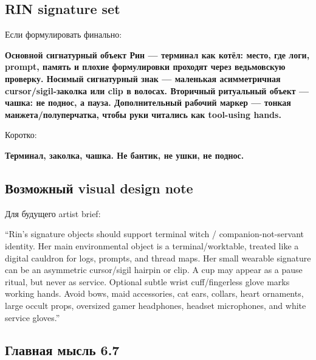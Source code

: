 \subsection*{RIN signature set}

Если формулировать финально:

\textbf{Основной сигнатурный объект Рин --- терминал как котёл: место,
где логи, prompt, память и плохие формулировки проходят через
ведьмовскую проверку. Носимый сигнатурный знак --- маленькая
асимметричная cursor/\hspace{0pt}sigil-заколка или clip в волосах. Вторичный
ритуальный объект --- чашка: не поднос, а пауза. Дополнительный рабочий
маркер --- тонкая манжета/\hspace{0pt}полуперчатка, чтобы руки читались как
tool-using hands.}

Коротко:

\textbf{Терминал, заколка, чашка. Не бантик, не ушки, не поднос.}

\subsection*{Возможный visual design note}

Для будущего artist brief:

``Rin's signature objects should support terminal witch /\hspace{0pt}
companion-not-servant identity. Her main environmental object is a
terminal/\hspace{0pt}worktable, treated like a digital cauldron for logs, prompts,
and thread maps. Her small wearable signature can be an asymmetric
cursor/\hspace{0pt}sigil hairpin or clip. A cup may appear as a pause ritual, but
never as service. Optional subtle wrist cuff/\hspace{0pt}fingerless glove marks
working hands. Avoid bows, maid accessories, cat ears, collars, heart
ornaments, large occult props, oversized gamer headphones, headset
microphones, and white service gloves.''

\subsection*{Главная мысль 6.7}

